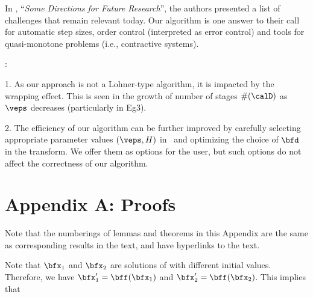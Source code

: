 	In \cite[Section 10]{nedialkov+2:validated-ode:99}, 
	``{\em Some Directions for Future Research}'',
	the authors
	presented a list of challenges that remain relevant today.
	Our algorithm is one answer to their call for automatic
	step sizes, order control (interpreted as error control)
	and tools for quasi-monotone problems (i.e., contractive systems).

:
	1. As our approach is not a Lohner-type algorithm, it is 
	impacted by the wrapping effect.  This is seen in the growth of
	number of stages $\#(\calD)$ as $\veps$ decreases
	(particularly in Eg3).
	
	2. The efficiency of our algorithm can be further
	improved by carefully
	selecting appropriate parameter values $(\veps, H)$ in \stepA\ and
	optimizing the choice of $\bfd$ in the transform.
	We offer them as options for the user, but such options
	do not affect the correctness of our algorithm.
	



\newpage
\appendix
\section{Appendix A: Proofs}
	Note that the numberings of lemmas and theorems
	in this Appendix are the same as corresponding
	results in the text, and have hyperlinks to the text.
	
	
		\bpf
		Note that $\bfx_1$ and $\bfx_2$ are solutions of 
		with different initial values. Therefore, we have $\bfx'_1 =
		\bff(\bfx_1)$ and $\bfx'_2 = \bff(\bfx_2)$. This implies that
		
